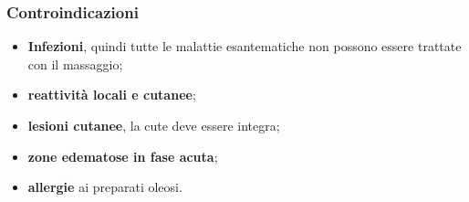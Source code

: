 \subsubsection{Controindicazioni}


\begin{itemize}
\item

  \textbf{Infezioni}, quindi tutte le malattie esantematiche non possono
  essere trattate con il massaggio;

\item

  \textbf{reattività locali e cutanee};

\item

  \textbf{lesioni cutanee}, la cute deve essere integra;

\item

  \textbf{zone edematose in fase acuta};

\item

  \textbf{allergie} ai preparati oleosi.

\end{itemize}

